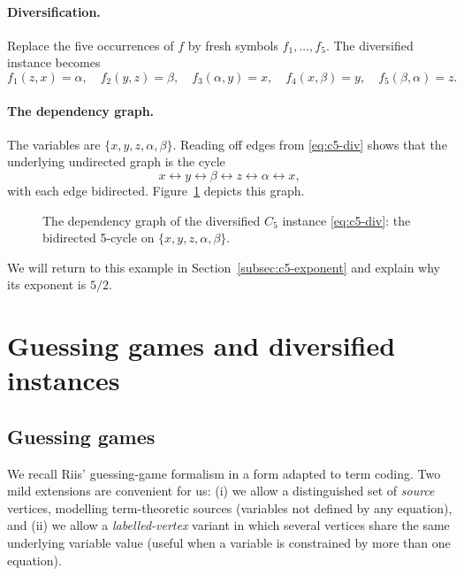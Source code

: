 \documentclass[11pt]{article}
\theoremstyle{plain}
\theoremstyle{definition}
\theoremstyle{definition}
\theoremstyle{remark}
\begin{document}
\paragraph{Diversification.}
Replace the five occurrences of $f$ by fresh symbols $f_1,\dots,f_5$.
The diversified instance becomes
\begin{equation}
\label{eq:c5-div}
  f_1(z,x)=\alpha,\quad f_2(y,z)=\beta,\quad f_3(\alpha,y)=x,\quad f_4(x,\beta)=y,\quad f_5(\beta,\alpha)=z.
\end{equation}

\paragraph{The dependency graph.}
The variables are $\{x,y,z,\alpha,\beta\}$.
Reading off edges from \eqref{eq:c5-div} shows that the underlying undirected graph is the cycle
\[x\!\leftrightarrow\!y\!\leftrightarrow\!\beta\!\leftrightarrow\!z\!\leftrightarrow\!\alpha\!\leftrightarrow\!x,\]
with each edge bidirected.
Figure~\ref{fig:c5} depicts this graph.

\begin{figure}[H]
\centering
{}
\caption{The dependency graph of the diversified $C_5$ instance \eqref{eq:c5-div}: the bidirected 5-cycle on
$\{x,y,z,\alpha,\beta\}$.}
\label{fig:c5}
\end{figure}

We will return to this example in Section~\ref{subsec:c5-exponent} and explain why its exponent is $5/2$.

\section{Guessing games and diversified instances}
\label{sec:guessing}

\subsection{Guessing games}

We recall Riis' guessing-game formalism \cite{riis2006information} in a form adapted to term coding.
Two mild extensions are convenient for us:
(i) we allow a distinguished set of \emph{source} vertices, modelling term-theoretic sources (variables not
defined by any equation), and
(ii) we allow a \emph{labelled-vertex} variant in which several vertices share the same underlying variable value
(useful when a variable is constrained by more than one equation).
\end{document}
